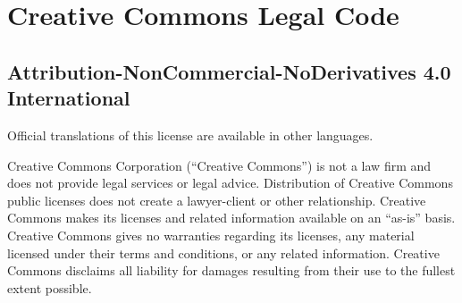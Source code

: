 \section{Creative Commons Legal Code}

\subsection{Attribution-NonCommercial-NoDerivatives 4.0 International}






Official translations of this license are available in other languages.



\par Creative Commons Corporation (“Creative Commons”) is not a law firm and does not provide legal services or legal advice. Distribution of Creative Commons public licenses does not create a lawyer-client or other relationship. Creative Commons makes its licenses and related information available on an “as-is” basis. Creative Commons gives no warranties regarding its licenses, any material licensed under their terms and conditions, or any related information. Creative Commons disclaims all liability for damages resulting from their use to the fullest extent possible.


